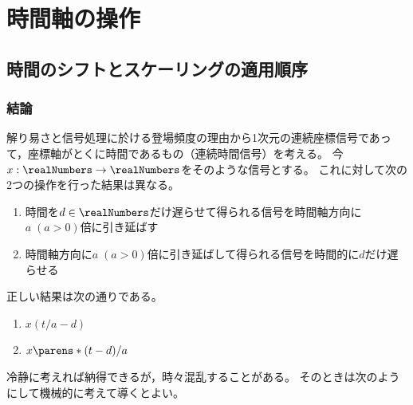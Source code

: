 \part{時間軸の操作}
    \chapter{時間のシフトとスケーリングの適用順序}
        \section{結論}
            \label{時間のシフトとスケーリングの適用順序.結論}
            解り易さと信号処理に於ける登場頻度の理由から1次元の連続座標信号であって，座標軸がとくに時間であるもの（連続時間信号）を考える。
            今$x:\realNumbers\to\realNumbers$をそのような信号とする。
            これに対して次の2つの操作を行った結果は異なる。
            \begin{enumerate}
                \item 時間を$d\in\realNumbers$だけ遅らせて得られる信号を時間軸方向に$a\;(a>0)$倍に引き延ばす
                \item 時間軸方向に$a\;(a>0)$倍に引き延ばして得られる信号を時間的に$d$だけ遅らせる
            \end{enumerate}
            正しい結果は次の通りである。
            \begin{enumerate}
                \item $x(t/a-d)$
                \item $x\parens*{(t-d)/a}$
            \end{enumerate}
            冷静に考えれば納得できるが，時々混乱することがある。
            そのときは次のようにして機械的に考えて導くとよい。
